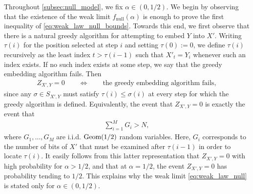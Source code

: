 \documentclass[11pt]{amsart}
\numberwithin{equation}{section}
\numberwithin{equation}{section}
\newcommand{\1}{\mathbbm{1}}
\newcommand{\Geom}{\textup{Geom}}
\newcommand{\fnull}{f_{\mathrm{null}}}
\theoremstyle{definition}
\begin{document}
Throughout \cref{subsec:null_model}, we fix $\alpha \in (0,1/2)$. We begin by observing that the existence of the weak limit $\fnull(\alpha)$ is enough to prove the first inequality of \eqref{eq:weak_law_null_bounds}. Towards this end, we first observe that there is a natural greedy algorithm \cite{diggavi2001transmission, mitzenmacher2009survey} for attempting to embed $Y$ into $X'$. Writing $\tau(i)$ for the position selected at step $i$ and setting $\tau(0) := 0$, we define $\tau(i)$ recursively as the least index $t > \tau(i-1)$ such that $X'_t = Y_i$ whenever such an index exists. If no such index exists at some step, we say that the greedy embedding algorithm fails. Then
\begin{align*}
    Z_{X',Y}=0 \qquad\Longleftrightarrow\qquad \text{the greedy embedding algorithm fails},
\end{align*}
since any $\sigma\in S_{X',Y}$ must satisfy $\tau(i) \le \sigma(i)$ at every step for which the greedy algorithm is defined. Equivalently, the event that $Z_{X',Y} = 0$ is exactly the event that
\begin{align*}
    \sum_{i=1}^M G_i > N,
\end{align*}
where $G_1,\dots,G_M$ are i.i.d. $\Geom(1/2)$ random variables. Here, $G_i$ corresponds to the number of bits of $X'$ that must be examined after $\tau(i-1)$ in order to locate $\tau(i)$. It easily follows from this latter representation that $Z_{X',Y} = 0$ with high probability for $\alpha > 1/2$, and that at $\alpha=1/2$, the event $Z_{X',Y} = 0$ has probability tending to $1/2$. This explains why the weak limit \eqref{eq:weak_law_null} is stated only for $\alpha \in (0,1/2)$.
\end{document}
